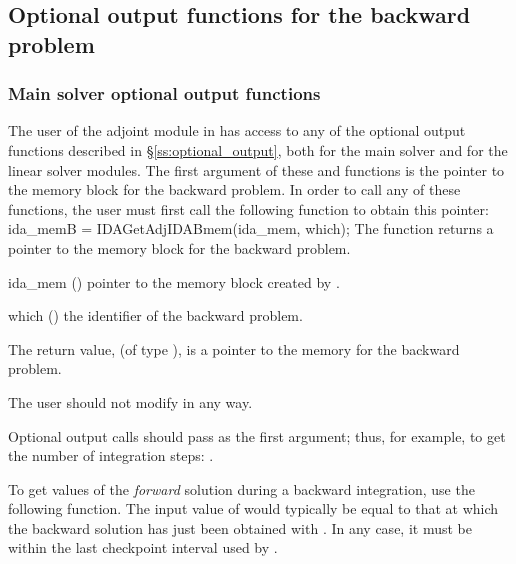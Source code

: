 \subsection{Optional output functions for the backward problem}
\label{ss:optional_output_b}

\subsubsection{Main solver optional output functions}

The user of the adjoint module in {\idas} has access to any of the
optional output functions described in \S\ref{ss:optional_output},
both for the main solver and for the linear solver modules. The first
argument of these  and  functions is the
pointer to the {\idas} memory block for the backward problem. In order
to call any of these functions, the user must first call the following
function to obtain this pointer:
{
  ida\_memB = IDAGetAdjIDABmem(ida\_mem, which);
}
{
  The function  returns a pointer to the {\idas}
  memory block for the backward problem.
}
{
  \begin{args}
  \item[ida\_mem] ()
    pointer to the {\idas} memory block created by .
  \item[which] ()
    the identifier of the backward problem.
  \end{args}
}
{
  The return value,  (of type ), is a pointer to the
  {\idas} memory for the backward problem.
}
{
  {\warn}The user should not modify  in any way.

  Optional output calls should pass  as the first argument;
  thus, for example, to get the number of integration steps:
  .
}


To get values of the {\it forward} solution during a backward integration,
use the following function.  The input value of  would typically be
equal to that at which the backward solution has just been obtained with
.  In any case, it must be within the last checkpoint interval
used by .


